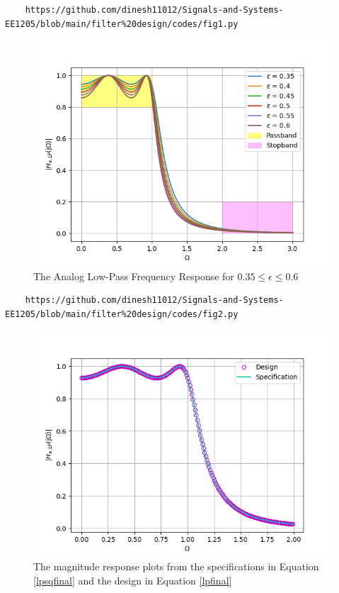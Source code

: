 \documentclass{article}
\begin{document}
\begin{lstlisting}
	https://github.com/dinesh11012/Signals-and-Systems-EE1205/blob/main/filter%20design/codes/fig1.py
\end{lstlisting}
\begin{figure}[H]
\includegraphics[width = \columnwidth]{figs/epsilon.png}
\caption{The Analog Low-Pass Frequency Response for $0.35 \leq \epsilon \leq 0.6$}
\label{fig2}
\end{figure}
\begin{lstlisting}
	https://github.com/dinesh11012/Signals-and-Systems-EE1205/blob/main/filter%20design/codes/fig2.py
\end{lstlisting}
\begin{figure}[H]
\includegraphics[width = \columnwidth]{figs/fig2.png}
\caption{The magnitude response plots from the specifications in Equation \ref{lpsqfinal} and the design in Equation \ref{lpfinal}}
\label{fig3}
\end{figure}
\end{document}
